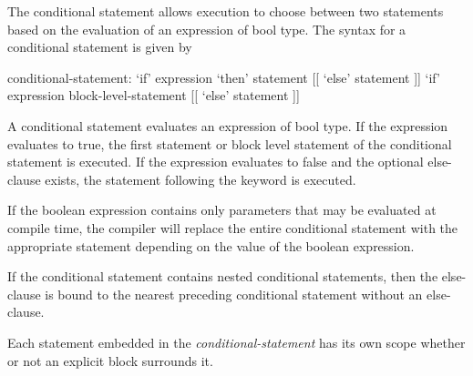 The conditional statement allows execution to choose between two
statements based on the evaluation of an expression of bool type. The
syntax for a conditional statement is given by
\begin{syntax}
conditional-statement:
  `if' expression `then' statement [[ `else' statement ]]
  `if' expression block-level-statement [[ `else' statement ]]
\end{syntax}

A conditional statement evaluates an expression of bool type. If the
expression evaluates to true, the first statement or block level statement of
the conditional statement is executed.  If the expression evaluates to
false and the optional else-clause exists, the statement following the
 keyword is executed.

If the boolean expression contains only parameters that may be evaluated at
compile time, the compiler will replace the entire conditional statement with
the appropriate statement depending on the value of the boolean 
expression.

If the conditional statement contains nested conditional statements, then 
the else-clause is bound to the nearest preceding conditional statement
without an else-clause.

Each statement embedded in the {\em conditional-statement} has its own
scope whether or not an explicit block surrounds it.
